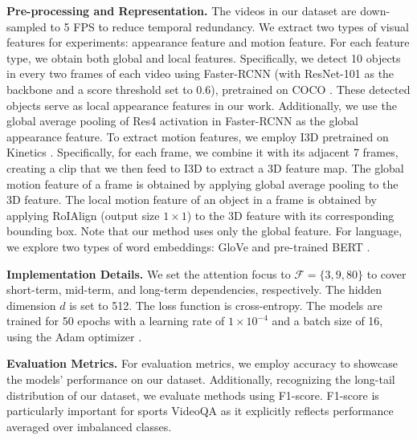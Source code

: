 {\noindent\textbf{Pre-processing and Representation.} The videos in our dataset are down-sampled to 5 FPS to reduce temporal redundancy. We extract two types of visual features for experiments: appearance feature and motion feature. For each feature type, we obtain both global and local features.
Specifically, we detect 10 objects in every two frames of each video using Faster-RCNN \citep{ren2015faster} (with ResNet-101 \citep{he2016deep} as the backbone and a score threshold set to 0.6), pretrained on COCO \citep{lin2014microsoft}. These detected objects serve as local appearance features in our work. Additionally, we use the global average pooling of Res4 activation in Faster-RCNN as the global appearance feature.
To extract motion features, we employ I3D \citep{carreira2017quo} pretrained on Kinetics \citep{carreira2017quo}. Specifically, for each frame, we combine it with its adjacent 7 frames, creating a clip that we then feed to I3D to extract a 3D feature map. The global motion feature of a frame is obtained by applying global average pooling to the 3D feature. The local motion feature of an object in a frame is obtained by applying RoIAlign \citep{he2017mask} (output size $1\times 1$) to the 3D feature with its corresponding bounding box. Note that our method uses only the global feature.
For language, we explore two types of word embeddings: GloVe \citep{pennington2014glove} and pre-trained BERT \citep{devlin2018bert}.
 
\noindent\textbf{Implementation Details.} We set the attention focus to $\mathcal{F}=\{3,9,80\}$ to cover short-term, mid-term, and long-term dependencies, respectively. The hidden dimension $d$ is set to 512. The loss function is cross-entropy. The models are trained for 50 epochs with a learning rate of $1\times 10^{-4}$ and a batch size of 16, using the Adam optimizer \citep{kingma2014adam}.

\noindent\textbf{Evaluation Metrics.} For evaluation metrics, we employ accuracy to showcase the models' performance on our dataset. Additionally, recognizing the long-tail distribution of our dataset, we evaluate methods using F1-score. F1-score is particularly important for sports VideoQA as it explicitly reflects performance averaged over imbalanced classes.



}

